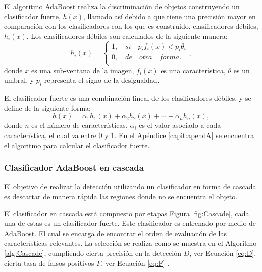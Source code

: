 El algoritmo AdaBoost realiza la discriminación de objetos construyendo un clasificador fuerte, $h(x)$, llamado así debido a que tiene una precisión mayor en comparación con los clasificadores con los que es construido, clasificadores débiles, $h_i(x)$. Los clasificadores débiles son calculados de la siguiente manera: 
\begin{equation}
h_i(x)=
\begin{cases}   
1, \quad si \quad  p_if_i(x)<p_i \theta_i \\
0, \quad de \quad otra \quad forma.\\
\end{cases} ,
\end{equation}
donde $x$ es una sub-ventana de la imagen, $f_i(x)$ es una característica, $\theta$ es un umbral, y $p_i$ representa el signo de la desigualdad.   

El clasificador fuerte es una combinación lineal de los clasificadores débiles, y se define de la siguiente forma: 
\begin{equation}
h(x)= \alpha_1h_1(x)+\alpha_2h_2(x)+ \cdots +\alpha_nh_n(x) ,
\end{equation}
donde $n$ es el n\'umero de características, $\alpha_i$ es el valor asociado a cada característica, el cual va entre $0$ y $1$. En el Apéndice \ref{capit:apendA} se encuentra el algoritmo para calcular el clasificador fuerte.

\subsubsection{Clasificador AdaBoost en cascada}\label{sssec:AdaboostCascade}   

El objetivo de realizar la detección utilizando un clasificador en forma de cascada es descartar de manera rápida las regiones donde no se encuentra el objeto.

El clasificador en cascada está compuesto por etapas Figura \ref{fig:Cascade}, cada una de estas es un clasificador fuerte. Este clasificador es entrenado por medio de AdaBoost. El cual se encarga de encontrar el orden de evaluación de las características relevantes. 
La selección se realiza como se muestra en el Algoritmo \ref{alg:Cascade}, cumpliendo cierta precisión en la detección $D$, ver Ecuación \ref{eq:D}, cierta tasa de falsos positivos $F$, ver Ecuación \ref{eq:F} .

